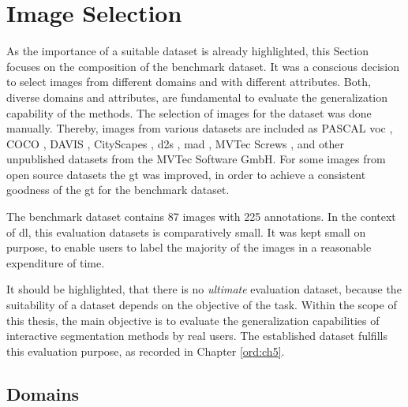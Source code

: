 
\section{Image Selection}\label{ord:ch4:sec4}

As the importance of a suitable dataset is already highlighted, this Section focuses on the composition of the benchmark dataset.
It was a conscious decision to select images from different domains and with different attributes.
Both, diverse domains and attributes, are fundamental to evaluate the generalization capability of the methods.
The selection of images for the dataset was done manually.
Thereby, images from various datasets are included as PASCAL \gls{voc} \cite{Eve20-PascalVOC}, COCO \cite{Lin14-Coco}, DAVIS \cite{Per16-DAVIS}, CityScapes \cite{Cor16-Cityscapes}, \gls{d2s} \cite{Paddo18-D2S}, \gls{mad} \cite{Bergmann19-MAD}, MVTec Screws \cite{UFN19-Screws}, and other unpublished datasets from the MVTec Software GmbH.
For some images from open source datasets the \gls{gt} was improved, in order to achieve a consistent goodness of the \gls{gt} for the benchmark dataset.

The benchmark dataset contains 87 images with 225 annotations.
In the context of \gls{dl}, this evaluation datasets is comparatively small.
It was kept small on purpose, to enable users to label the majority of the images in a reasonable expenditure of time.
 
It should be highlighted, that there is no \textit{ultimate} evaluation dataset, because the suitability of a dataset depends on the objective of the task.
Within the scope of this thesis, the main objective is to evaluate the generalization capabilities of interactive segmentation methods by real users.
The established dataset fulfills this evaluation purpose, as recorded in Chapter \ref{ord:ch5}.


\subsection{Domains}\label{ord:ch4:sec2:subsec1}

